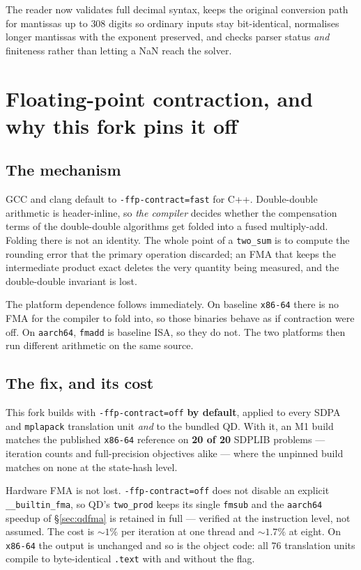 \documentclass[11pt]{article}
\newcommand{\code}[1]{\texttt{#1}}
\begin{document}
The reader now validates full decimal syntax, keeps the original conversion path for mantissas up
to $308$ digits so ordinary inputs stay bit-identical, normalises longer mantissas with the
exponent preserved, and checks parser status \emph{and} finiteness rather than letting a NaN reach
the solver.

\section{Floating-point contraction, and why this fork pins it off}

\subsection{The mechanism}

GCC and clang default to \code{-ffp-contract=fast} for C++. Double-double arithmetic is
header-inline, so \emph{the compiler} decides whether the compensation terms of the
double-double algorithms get folded into a fused multiply-add. Folding there is not an identity.
The whole point of a \code{two\_sum} is to compute the rounding error that the primary operation
discarded; an FMA that keeps the intermediate product exact deletes the very quantity being
measured, and the double-double invariant is lost.

The platform dependence follows immediately. On baseline \code{x86-64} there is no FMA for the
compiler to fold into, so those binaries behave as if contraction were off. On \code{aarch64},
\code{fmadd} is baseline ISA, so they do not. The two platforms then run different arithmetic on
the same source.

\subsection{The fix, and its cost}

This fork builds with \code{-ffp-contract=off} \textbf{by default}, applied to every SDPA and
\code{mplapack} translation unit \emph{and} to the bundled QD. With it, an M1 build matches the
published \code{x86-64} reference on \textbf{20 of 20} SDPLIB problems --- iteration counts and
full-precision objectives alike --- where the unpinned build matches on none at the state-hash
level.

Hardware FMA is not lost. \code{-ffp-contract=off} does not disable an explicit
\code{\_\_builtin\_fma}, so QD's \code{two\_prod} keeps its single \code{fmsub} and the
\code{aarch64} speedup of \S\ref{sec:qdfma} is retained in full --- verified at the instruction
level, not assumed. The cost is $\sim$$1\%$ per iteration at one thread
and $\sim$$1.7\%$ at eight. On \code{x86-64} the output is unchanged and so is the object code:
all $76$ translation units compile to byte-identical \code{.text} with and without the flag.
\end{document}
